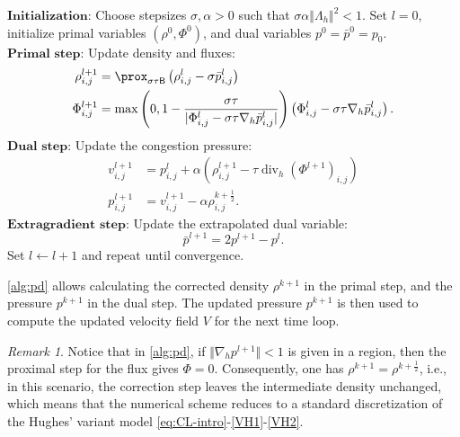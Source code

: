 \documentclass[final,reqno]{amsart}
\theoremstyle{plain}
\theoremstyle{definition}
\theoremstyle{remark}
\newtheorem{remark}{Remark}	%
\numberwithin{remark}{section}	%
\numberwithin{example}{section}	%
\DeclareMathOperator{\dive}{div}
\newcommand{\ie}{i.e.,\xspace}	%
\newcommand{\BB}{\mathsf{B}}
\begin{document}
\begin{algorithm}[H]
    \caption{Chambolle-Pock (PD) iterations for the Correction Step}
    \label{alg:pd}
    \begin{algorithmic}[1]
        \State $\textbf{Initialization:}$ Choose stepsizes $\sigma, \alpha > 0$ such that $\sigma\alpha\Vert\Lambda_{h}\Vert^2 < 1$. Set $l=0$, initialize primal variables $(\rho^0, \Phi^0)$, and dual variables $p^0 = \bar{p}^0 = p_0$.
        \State $\textbf{Primal step:}$ Update density and fluxes:
        \begin{equation*}
            \begin{aligned}
                \rho_{i,j}^{l+1} &= \prox_{\sigma\tau\BB}\left( \rho_{i,j}^{l} - \sigma \bar{p}^{l}_{i,j} \right) \\
                \Phi_{i, j}^{l+1} &= \max\left(0, 1 - \frac{\sigma\tau}{\vert\Phi_{i, j}^{l} - \sigma\tau\nabla_h \bar{p}_{i,j}^{l}\vert}\right) \left(\Phi_{i, j}^{l} - \sigma\tau\nabla_h \bar{p}_{i,j}^{l}\right).
            \end{aligned}
        \end{equation*}
        \State $\textbf{Dual step:}$ Update the congestion pressure:
        \begin{equation*}
            \begin{aligned}
                v^{l+1}_{i,j} &= p^{l}_{i,j} + \alpha \left( \rho^{l+1}_{i,j} - \tau\dive_h(\Phi^{l+1})_{i,j} \right) \\
                p^{l+1}_{i,j} &= v^{l+1}_{i,j} - \alpha \rho_{i,j}^{k+\frac{1}{2}}.
            \end{aligned}
        \end{equation*}
        \State $\textbf{Extragradient step:}$ Update the extrapolated dual variable:
        \begin{equation*}
            \bar{p}^{l+1} = 2p^{l+1} - p^{l}.
        \end{equation*}
        \State Set $l \gets l+1$ and repeat until convergence.
    \end{algorithmic}
\end{algorithm}
\cref{alg:pd} allows calculating the corrected density $\rho^{k+1}$ in the primal step, and the pressure $p^{k+1}$ in the dual step. The updated pressure $p^{k+1}$ is then used to compute the updated velocity field $V$ for the next time loop.



\begin{remark}
 Notice that in \cref{alg:pd}, if $\Vert\nabla_h p^{l+1}\Vert<1$ is given in a region, then the proximal step for the flux gives $\Phi = 0$. Consequently, one has $\rho^{k+1} = \rho^{k+\frac{1}{2}}$, \ie in this scenario, the correction step leaves the intermediate density unchanged, which means that the numerical scheme reduces to a standard discretization of the Hughes' variant model \eqref{eq:CL-intro}-\eqref{VH1}-\eqref{VH2}.
\end{remark}
\end{document}
